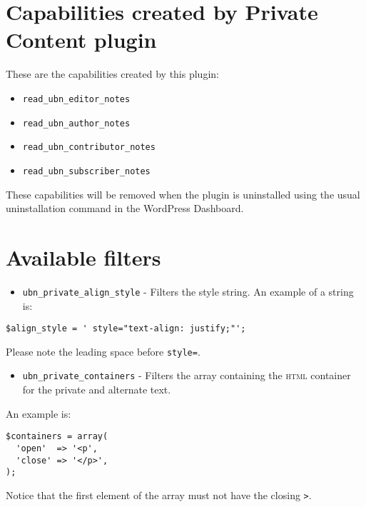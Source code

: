\documentclass[
	titlepage,
	headinclude,
	abstract=on,
	paper=a4,
	fontsize=11pt,
]{scrartcl}
\begin{document}
\section{Capabilities created by Private Content plugin}

These are the capabilities created by this plugin:

\begin{itemize}
 \item \verb+read_ubn_editor_notes+
 \item \verb+read_ubn_author_notes+
 \item \verb+read_ubn_contributor_notes+
 \item \verb+read_ubn_subscriber_notes+
\end{itemize}

These capabilities will be removed when the plugin is uninstalled using the usual uninstallation command in the WordPress Dashboard.

\section{Available filters}

\begin{itemize}
 \item \verb+ubn_private_align_style+ - Filters the style string. An example of a string is:
\end{itemize}

\begin{lstlisting}
$align_style = ' style="text-align: justify;"';
\end{lstlisting}

Please note the leading space before \verb+style=+.

\begin{itemize}
 \item \verb+ubn_private_containers+ - Filters the array containing the \textsc{html} container for the private and alternate text.
\end{itemize}

An example is:

\begin{lstlisting}
$containers = array(
  'open'  => '<p',
  'close' => '</p>',
);
\end{lstlisting}

Notice that the first element of the array must not have the closing \verb+>+.
\end{document}
